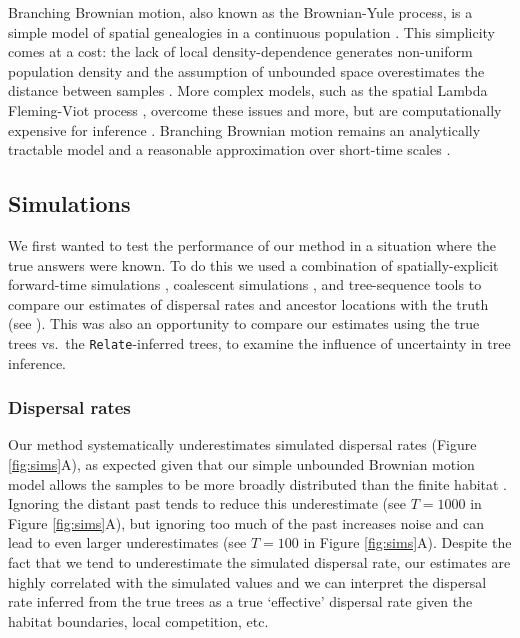\documentclass[12pt]{article}
\begin{document}
Branching Brownian motion, also known as the Brownian-Yule process, is a simple model of spatial genealogies in a continuous population \citep{malecot1948mathematics,wright1943isolation}.
This simplicity comes at a cost: the lack of local density-dependence generates non-uniform population density \citep{felsenstein1975pain} and the assumption of unbounded space overestimates the distance between samples \citep{kalkauskas2021sampling}.
More complex models, such as the spatial Lambda Fleming-Viot process \citep{barton2010new}, overcome these issues and more, but are computationally expensive for inference \citep{wirtz2023connections}.
Branching Brownian motion remains an analytically tractable model and a reasonable approximation over short-time scales \citep{edwards1970estimation,rannala1996probability,meligkotsidou2007postprocessing,novembre2009likelihood}.

\subsection*{Simulations}

We first wanted to test the performance of our method in a situation where the true answers were known.
To do this we used a combination of spatially-explicit forward-time simulations \citep{haller2023slim}, coalescent simulations \citep{kelleher2016efficient}, and tree-sequence tools \citep{haller2019tree,kelleher2019inferring,speidel2019method} to compare our estimates of dispersal rates and ancestor locations with the truth (see ).
This was also an opportunity to compare our estimates using the true trees vs.\ the \texttt{Relate}-inferred trees, to examine the influence of uncertainty in tree inference.

\subsubsection*{Dispersal rates}

Our method systematically underestimates simulated dispersal rates (Figure \ref{fig:sims}A), as expected given that our simple unbounded Brownian motion model allows the samples to be more broadly distributed than the finite habitat \citep[e.g.,][]{ianni2023exploring,kalkauskas2021sampling}.
Ignoring the distant past tends to reduce this underestimate (see $T=1000$ in Figure \ref{fig:sims}A), but ignoring too much of the past increases noise and can lead to even larger underestimates (see $T=100$ in Figure \ref{fig:sims}A).
Despite the fact that we tend to underestimate the simulated dispersal rate, our estimates are highly correlated with the simulated values and we can interpret the dispersal rate inferred from the true trees as a true `effective' dispersal rate given the habitat boundaries, local competition, etc. 
\end{document}

